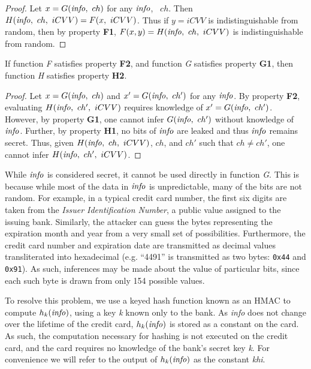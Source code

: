 \begin{proof}
  Let $x = G(\textrm{\emph{info}},~ ch)$ for any $\textrm{\emph{info}}$,~ $ch$.
  Then $H(\textrm{\emph{info}},~ ch,~ iCVV) = F(x,~ iCVV)$.
  Thus if $y = iCVV$ is indistinguishable from random, then by property \textbf{F1}, $F(x,y) = H(\textrm{\emph{info}},~ ch,~ iCVV)$ is indistinguishable from random.
\end{proof}


\begin{theorem}
If function \emph{F} satisfies property \textbf{F2}, and function \emph{G} satisfies property \textbf{G1}, then function \emph{H} satisfies property \textbf{H2}.
\end{theorem}

\begin{proof}
  Let $x = G(\textrm{\emph{info}},~ ch)$ and $x' = G(\textrm{\emph{info}},~ ch')$ for any $\textrm{\emph{info}}$.
  By property \textbf{F2}, evaluating $H(\textrm{\emph{info}},~ ch',~ iCVV)$ requires knowledge of $x' = G(\textrm{\emph{info}},~ ch')$.
  However, by property \textbf{G1}, one cannot infer $G(\textrm{\emph{info}},~ ch')$ without knowledge of $\textrm{\emph{info}}$.
  Further, by property \textbf{H1}, no bits of $\textrm{\emph{info}}$ are leaked and thus $\textrm{\emph{info}}$ remains secret.
  Thus, given $H(\textrm{\emph{info}},~ ch,~ iCVV)$, $ch$, and $ch'$ such that $ch \neq ch'$, one cannot infer $H(\textrm{\emph{info}},~ ch',~ iCVV)$.
\end{proof}

While $\textrm{\emph{info}}$ is considered secret, it cannot be used directly in function \emph{G}.
This is because while most of the data in $\textrm{\emph{info}}$ is unpredictable, many of the bits are not random.
For example, in a typical credit card number, the first six digits are taken from the \emph{Issuer Identification Number}, a public value assigned to the issuing bank.
Similarly, the attacker can guess the bytes representing the expiration month and year from a very small set of possibilities.
Furthermore, the credit card number and expiration date are transmitted as decimal values transliterated into hexadecimal (e.g. ``4491'' is transmitted as two bytes: \texttt{0x44} and \texttt{0x91}).
As such, inferences may be made about the value of particular bits, since each such byte is drawn from only 154 possible values.

To resolve this problem, we use a keyed hash function known as an HMAC \cite{krawczyk1997hmac} to compute $h_k(\textrm{\emph{info}})$, using a key \emph{k} known only to the bank.
As \emph{info} does not change over the lifetime of the credit card, $h_k(\textrm{\emph{info}})$ is stored as a constant on the card.
As such, the computation necessary for hashing is not executed on the credit card, and the card requires no knowledge of the bank's secret key \emph{k}.
For convenience we will refer to the output of $h_k(\textrm{\emph{info}})$ as the constant \emph{khi}.

